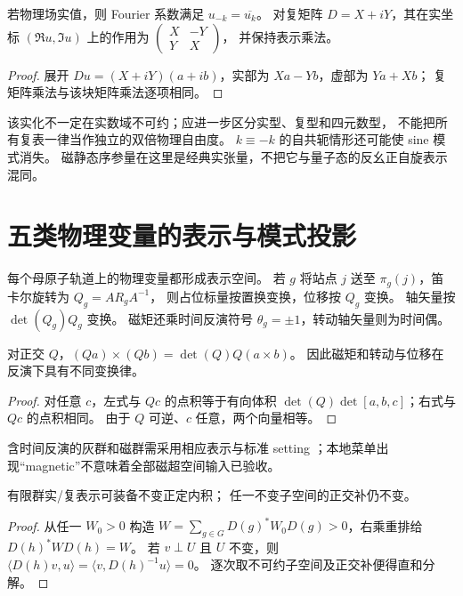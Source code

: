 \begin{proposition}[复表示的实化]
若物理场实值，则 Fourier 系数满足 $u_{-k}=\overline{u_k}$。
对复矩阵 $D=X+iY$，其在实坐标 $(\Re u,\Im u)$ 上的作用为
$\left(\begin{smallmatrix}X&-Y\\Y&X\end{smallmatrix}\right)$，
并保持表示乘法。
\end{proposition}
\begin{proof}
展开 $Du=(X+iY)(a+ib)$，实部为 $Xa-Yb$，虚部为 $Ya+Xb$；
复矩阵乘法与该块矩阵乘法逐项相同。
\end{proof}
该实化不一定在实数域不可约；应进一步区分实型、复型和四元数型，
不能把所有复表一律当作独立的双倍物理自由度。
$k\equiv-k$ 的自共轭情形还可能使 sine 模式消失。
磁静态序参量在这里是经典实张量，不把它与量子态的反幺正自旋表示混同。

\section{五类物理变量的表示与模式投影}\label{sec:physical}
每个母原子轨道上的物理变量都形成表示空间。
若 $g$ 将站点 $j$ 送至 $\pi_g(j)$，笛卡尔旋转为 $Q_g=AR_gA^{-1}$，
则占位标量按置换变换，位移按 $Q_g$ 变换。
轴矢量按 $\det(Q_g)Q_g$ 变换。
磁矩还乘时间反演符号 $\theta_g=\pm1$，转动轴矢量则为时间偶。

\begin{proposition}[极矢量与轴矢量区别]
对正交 $Q$，$(Qa)\times(Qb)=\det(Q)Q(a\times b)$。
因此磁矩和转动与位移在反演下具有不同变换律。
\end{proposition}
\begin{proof}
对任意 $c$，左式与 $Qc$ 的点积等于有向体积
$\det(Q)\det[a,b,c]$；右式与 $Qc$ 的点积相同。
由于 $Q$ 可逆、$c$ 任意，两个向量相等。
\end{proof}
含时间反演的灰群和磁群需采用相应表示与标准 setting
\citep{Magnetic2012,IsoMag}；本地菜单出现“magnetic”不意味着全部磁超空间输入已验收。

\begin{theorem}[对称内积与完全可约性]
有限群实/复表示可装备不变正定内积；
任一不变子空间的正交补仍不变。
\end{theorem}
\begin{proof}
从任一 $W_0>0$ 构造
$W=\sum_{g\in G}D(g)^*W_0D(g)>0$，右乘重排给 $D(h)^*WD(h)=W$。
若 $v\perp U$ 且 $U$ 不变，则
$\langle D(h)v,u\rangle=\langle v,D(h)^{-1}u\rangle=0$。
逐次取不可约子空间及正交补便得直和分解。
\end{proof}

